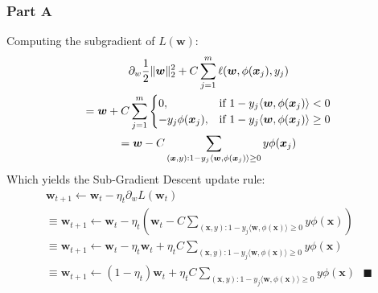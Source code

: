 \documentclass[11pt, oneside]{article}   	%
\begin{document}
\subsubsection{Part A}
Computing the subgradient of $L(\boldsymbol{w})$:
\begin{gather*}
\partial_w \frac{1}{2} \lVert\boldsymbol{w}\rVert_2^2 + C \sum_{j = 1}^m \ell(\boldsymbol{w}, \phi(\boldsymbol{x}_j)
, y_j)\\
= \boldsymbol{w} + C \sum_{j = 1}^m \begin{cases} 0, & \mbox{if } 1 - y_j \langle \boldsymbol{w}, \phi(\boldsymbol{x}_j) \rangle < 0 \\ -y_j \phi(\boldsymbol{x}_j), & \mbox{if } 1 - y_j \langle \boldsymbol{w}, \phi(\boldsymbol{x}_j) \rangle \geq 0 \end{cases}\\
= \boldsymbol{w} - C \sum_{(\boldsymbol{x}, y): 1 - y_j \langle \boldsymbol{w}, \phi(\boldsymbol{x}_j) \rangle \geq 0} y \phi(\boldsymbol{x}_j)
\end{gather*}
Which yields the Sub-Gradient Descent update rule:
\begin{gather*}
\boldsymbol{w}_{t + 1} \leftarrow \boldsymbol{w}_t - \eta_t \partial_w L(\boldsymbol{w}_t)\\
\equiv \boldsymbol{w}_{t + 1} \leftarrow \boldsymbol{w}_t - \eta_t (\boldsymbol{w}_t - C \sum_{(\boldsymbol{x}, y): 1 - y_j \langle \boldsymbol{w}, \phi(\boldsymbol{x}) \rangle \geq 0} y \phi(\boldsymbol{x}))\\
\equiv \boldsymbol{w}_{t + 1} \leftarrow \boldsymbol{w}_t - \eta_t  \boldsymbol{w}_t + \eta_t C \sum_{(\boldsymbol{x}, y): 1 - y_j \langle \boldsymbol{w}, \phi(\boldsymbol{x}) \rangle \geq 0} y \phi(\boldsymbol{x})\\
\equiv \boldsymbol{w}_{t + 1} \leftarrow (1 - \eta_t) \boldsymbol{w}_t + \eta_t C \sum_{(\boldsymbol{x}, y): 1 - y_j \langle \boldsymbol{w}, \phi(\boldsymbol{x}) \rangle \geq 0} y \phi(\boldsymbol{x}) \text{ } \blacksquare
\end{gather*}

\newpage{}
\end{document}
